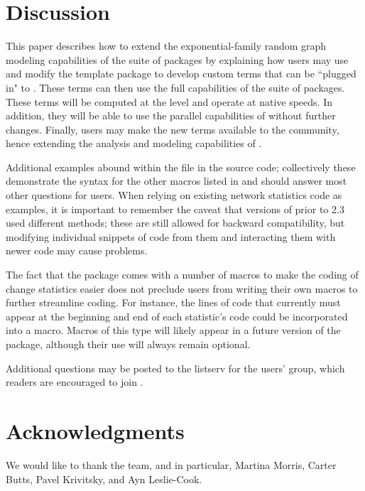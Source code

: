 \documentclass[nojss]{jss}
\begin{document}
\section{Discussion}

This paper describes how to extend the exponential-family random graph modeling
capabilities of the  suite of packages by
explaining how users may use and modify the template package  to develop custom terms that can be ``plugged in" to . These terms can then use the full capabilities of the  suite of packages.
These terms will be computed at the  level and operate at native speeds. In
addition, they will be able to use the parallel capabilities of 
without further changes. 
Finally, users may make the new terms
available to the  community, hence extending the analysis and
modeling capabilities of .

Additional examples abound within the  file in the source
code; collectively these demonstrate the syntax for the other macros listed in
 and should answer most other questions for users. When
relying on existing network statistics code as examples, it is important to
remember the caveat that versions of  prior to 2.3 used different
methods; these are still allowed for backward compatibility, but modifying
individual snippets of code from them and interacting them with newer code may
cause problems.

The fact that the  package comes with a number of macros to
make the coding of change statistics easier does not preclude users from
writing their own macros to further streamline coding. For
instance, the lines of code that currently must appear at the beginning and end
of each statistic's  code could be incorporated into a macro. Macros
of this type will likely appear in a future version
of the  package, although their use will always remain
optional.

Additional questions may be posted to the listserv for the  users'
group, which readers are encouraged to join \citep{statnetusersgroup}.

\section*{Acknowledgments}

We would like to thank the  team, and in particular, Martina Morris, Carter
Butts, Pavel Krivitsky, and Ayn Leslie-Cook.







\end{document}
